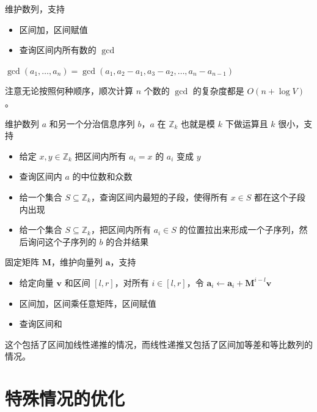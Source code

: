 \begin{exercise}[$\gcd$]
    维护数列，支持
    \begin{itemize}
        \item 区间加，区间赋值
        \item 查询区间内所有数的 $\gcd$
    \end{itemize}
    \begin{hint}
        $\gcd(a_1,\ldots,a_n)=\gcd(a_1,a_2-a_1,a_3-a_2,\ldots,a_n-a_{n-1})$
    \end{hint}
\end{exercise}
\begin{remark}
    注意无论按照何种顺序，顺次计算 $n$ 个数的 $\gcd$ 的复杂度都是 $O(n+\log V)$。
\end{remark}

\begin{exercise}[小值域]
    维护数列 $a$ 和另一个分治信息序列 $b$，$a$ 在 $\mathbb Z_k$ 也就是模 $k$ 下做运算且 $k$ 很小，支持
    \begin{itemize}
        \item 给定 $x,y\in\mathbb Z_k$ 把区间内所有 $a_i=x$ 的 $a_i$ 变成 $y$
        \item 查询区间内 $a$ 的中位数和众数
        \item 给一个集合 $S\subseteq \mathbb Z_k$，查询区间内最短的子段，使得所有 $x\in S$ 都在这个子段内出现
        \item 给一个集合 $S\subseteq \mathbb Z_k$，把区间内所有 $a_i\in S$ 的位置拉出来形成一个子序列，然后询问这个子序列的 $b$ 的合并结果
    \end{itemize}
\end{exercise}

\begin{exercise}[加矩阵幂]
    固定矩阵 $\mathbf M$，维护向量列 $\mathbf a$，支持
    \begin{itemize}
        \item 给定向量 $\mathbf v$ 和区间 $[l,r]$，对所有 $i\in [l,r]$，令 $\mathbf a_i\gets \mathbf a_i+\mathbf M^{i-l}\mathbf v$
        \item 区间加，区间乘任意矩阵，区间赋值
        \item 查询区间和
    \end{itemize}
\end{exercise}
\begin{remark}
    这个包括了区间加线性递推的情况，而线性递推又包括了区间加等差和等比数列的情况。
\end{remark}

\section{特殊情况的优化}

